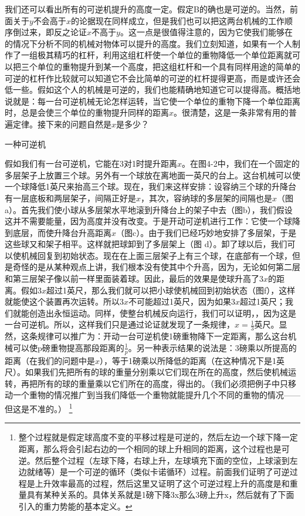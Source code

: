 \documentclass[12pt,oneside]{book}
\begin{document}
我们还可以看出所有的可逆机提升的高度一定。假定B的确也是可逆的。当然，前面关于$ y $不会高于$ x $的论据现在同样成立，但是我们也可以把这两台机械的工作顺序倒过来，即反之论证$ x $不高于$ y $。这一点是很值得注意的，因为它使我们能够在的情况下分析不同的机械对物体可以提升的高度。我们立刻知道，如果有一个人制作了一组极其精巧的杠杆，利用这组杠杆使一个单位的重物降低一个单位距离就可以把三个单位的重物提升到某一个高度，把这组杠杆和一个具有同样用途的简单的可逆的杠杆作比较就可以知道它不会比简单的可逆的杠杆提得更高，而是或许还会低一些。假如这个人的机械是可逆的，我们也能精确地知道它可以提得高。概括地说就是：每一台可逆机械无论怎样运转，当它使一个单位的重物下降一个单位距离时，总是会使三个单位的重物提升同样的距离$ x $。很清楚，这是一条非常有用的普遍定律。接下来的问题自然是$ x $是多少？
\begin{fig}{一种可逆机}
\caption{一种可逆机}
\label{fig:一种可逆机}
\end{fig}
假如我们有一台可逆机，它能在3对1时提升距离$ x $。在图4-2中，我们在一个固定的多层架子上放置三个球。另外有一个球放在离地面一英尺的台上。这台机械可以使一个球降低1英尺来抬高三个球。现在，我们来这样安排：设容纳三个球的升降台有一层底板和两层架子，间隔正好是$ x $，其次，容纳球的多层架的间隔也是$ x $（图a）。首先我们使小球从多层架水平地滚到升降台上的架子中去（图b），我们假设这并不需要能量，因为高度并没有改变。于是开动可逆机进行工作：它使一个球降到底层，而使升降台升高距离$ x $（图c）。由于我们已经巧妙地安排了多层架，于是这些球又和架子相平。这样就把球卸到了多层架上（图 d）。卸了球以后，我们可以使机械回复到初始状态。现在在上面三层架子上有三个球，在底部有一个球，但是奇怪的是从某种观点上讲，我们根本没有使其中个升高，因为，无论如何第二层和第三层架子像以前一样里面装着球。因此，最后的效果是使球升高了$ 3x$的距离。假如$  3x $超过1英尺，那么我们就可以把小球使机械回到初始状态（图f），这样就能使这个装置再次运转。所以$ 3x $不可能超过1英尺，因为如果$ 3x $超过1英尺；我们就能创造出永恒运动。同样，使整台机械反向运行，我们可以证明，，因为这是一台可逆机。所以，这样我们只是通过论证就发现了一条规律，$ x=\frac{1}{3} $英尺。显然，这条规律可以推广为：开动一台可逆机使1磅重物降下一定距离，那么这台机械可以使p磅重物提高那段距离的$ \frac{1}{p} $。另一种表示结果的说法是：3磅乘以所提高的距离（在我们的问题中是$ x $），等于1磅乘以所降低的距离（在这种情况下是1英尺）。如果我们先把所有的球的重量分别乘以它们现在所在的高度，然后使机械运转，再把所有的球的重量乘以它们所在的高度，得出的。（我们必须把例子中只移动一个重物的情况推广到当我们降低一个重物就能提升几个不同的重物的情况——但这是不准的。）
\footnote{
整个过程就是假定球高度不变的平移过程是可逆的，然后左边一个球下降一定距离，那么将会引起右边的一个相同的球上升相同的距离，这个过程也是可逆。然后整个过程（左球下降，右球上升，左球填充下面的空位，上球滚到左边就绪等）是一个可逆的循环（类似卡诺循环）过程。前面我们证明了可逆过程是上升效率最高的过程，然后这里又证明了这个可逆过程上升的高度是和重量具有某种关系的。具体关系就是1磅下降3x那么3磅上升x，然后就有了下面引入的重力势能的基本定义。
}
\end{document}
